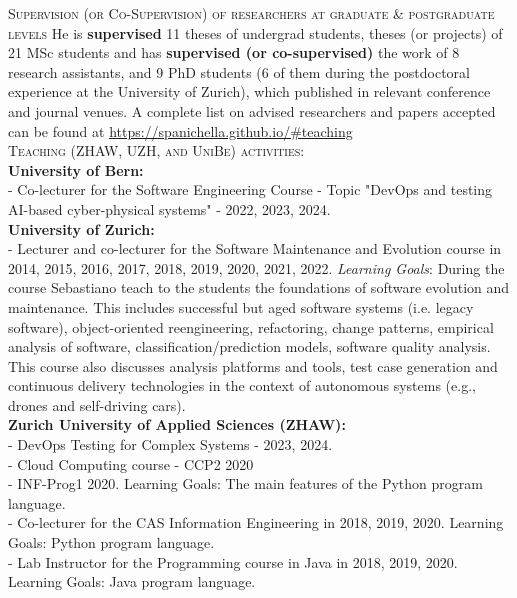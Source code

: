 \documentclass[11pt]{article}
\begin{document}
\medskip \medskip
\textsc{Supervision (or Co-Supervision) of researchers at graduate \& postgraduate levels}
\medskip
He is \textbf{supervised} 11 theses of undergrad students, theses (or projects) of 21 MSc students and has \textbf{supervised (or co-supervised)} the work of 8 research assistants, and 9 PhD students (6 of them during the postdoctoral experience at the University of Zurich), which published in relevant conference and journal venues. A complete list on advised researchers and papers accepted can be found at
\href{https://spanichella.github.io/\#teaching}{https://spanichella.github.io/\#teaching}
\medskip \\%
\textsc{Teaching (ZHAW, UZH, and UniBe) activities:}
\medskip \\
\textbf{University of Bern:}
\medskip \\
-   Co-lecturer for the Software Engineering Course - Topic "DevOps and testing AI-based cyber-physical systems" - 2022, 2023, 2024.  
\medskip \\ 
\textbf{University of Zurich:} 
\medskip \\
-   Lecturer and co-lecturer for the Software Maintenance and Evolution course in 2014, 2015, 2016, 2017, 2018, 2019, 2020, 2021, 2022.   \textit{Learning Goals}: During the course Sebastiano teach to
the students the foundations of software evolution and maintenance. This includes successful but aged software systems (i.e. legacy software), object-oriented reengineering, refactoring, change patterns, empirical analysis of software, classification/prediction models, software quality analysis. This course also discusses analysis platforms and tools, test case generation and continuous delivery technologies in the context of autonomous systems (e.g., drones and self-driving cars).
\medskip \\
\textbf{Zurich University of Applied Sciences (ZHAW):}
\medskip \\
- DevOps Testing for Complex Systems - 2023, 2024. \\
- Cloud Computing course - CCP2 2020\\
- INF-Prog1 2020. Learning Goals: The main features of the Python program language.\\
- Co-lecturer for the CAS Information Engineering in 2018, 2019, 2020.
Learning Goals: Python program language.\\
- Lab Instructor for the Programming course in Java in 2018, 2019, 2020.
Learning Goals: Java program language.
\medskip 
\vspace{-5mm} 
\end{document}
